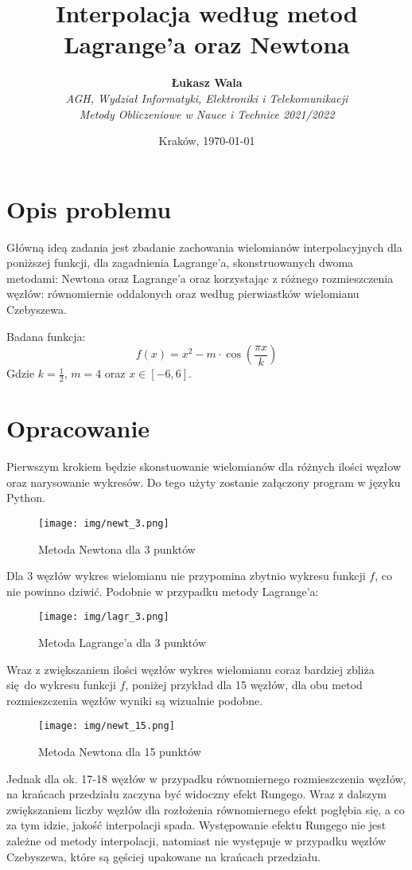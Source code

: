 \documentclass{article}
\title{Interpolacja według metod Lagrange'a oraz Newtona}
\author{\textbf{Łukasz Wala}\\
    \textit{AGH, Wydział Informatyki, Elektroniki i Telekomunikacji} \\
    \textit{Metody Obliczeniowe w Nauce i Technice 2021/2022}}
\date{Kraków, \today}
\begin{document}
\maketitle

\section{Opis problemu}
Główną ideą zadania jest zbadanie zachowania wielomianów interpolacyjnych dla poniższej funkcji, dla zagadnienia Lagrange'a, skonstruowanych dwoma metodami: Newtona oraz 
Lagrange'a oraz korzystając z różnego rozmieszczenia węzłów: równomiernie oddalonych oraz według pierwiastków wielomianu Czebyszewa.

Badana funkcja:
\[f(x)=x^2-m\cdot\cos\left(\frac{\pi x}{k}\right)\]
Gdzie $k=\frac{1}{2}$, $m=4$ oraz $x\in [-6,6]$.


\section{Opracowanie}
Pierwszym krokiem będzie skonstuowanie wielomianów dla różnych ilości węzłow oraz narysowanie wykresów. 
Do tego użyty zostanie załączony program w języku Python. 

\begin{figure}[H]
    \centering
    \texttt{[image: img/newt\_3.png]}
    \caption{Metoda Newtona dla 3 punktów}
\end{figure}

Dla 3 węzłów wykres wielomianu nie przypomina zbytnio wykresu funkcji $f$, co nie powinno dziwić. Podobnie w przypadku metody Lagrange'a:

\begin{figure}[H]
    \centering
    \texttt{[image: img/lagr\_3.png]}
    \caption{Metoda Lagrange'a dla 3 punktów}
\end{figure}

Wraz z zwiększaniem ilości węzłów wykres wielomianu coraz bardziej zbliża się do wykresu funkcji $f$, 
poniżej przykład dla 15 węzłów, dla obu metod rozmieszczenia węzłów wyniki są wizualnie podobne.

\begin{figure}[H]
    \centering
    \texttt{[image: img/newt\_15.png]}
    \caption{Metoda Newtona dla 15 punktów}
\end{figure}

Jednak dla ok. 17-18 węzłów w przypadku równomiernego rozmieszczenia węzłów, na krańcach przedziału zaczyna być widoczny efekt 
Rungego. Wraz z dalszym zwiększaniem liczby węzłów dla rozłożenia równomiernego efekt pogłębia się, a co za tym idzie,
jakość interpolacji spada. Występowanie efektu Rungego nie jest zależne od metody interpolacji, natomiast nie występuje w przypadku węzłów 
Czebyszewa, które są gęściej upakowane na krańcach przedziału.
\end{document}
